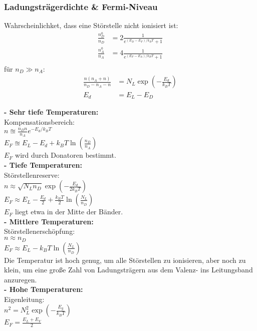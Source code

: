 \subsubsection*{Ladungsträgerdichte \& Fermi-Niveau}
Wahrscheinlichket, dass eine Störstelle nicht ionisiert ist:
\begin{equation*}
    \begin{aligned}
        \frac{n_D^0}{n_D} &= 2\frac{1}{e^{(E_D - E_F)/k_B T} +1} \\
        \frac{n_A^0}{n_A} &= 4\frac{1}{e^{(E_F - E_A)/k_B T} +1} \\
    \end{aligned}
\end{equation*}
für $n_D \gg n_A$: 
\begin{equation*}
    \begin{aligned}
        \frac{n(n_A + n)}{n_D - n_A - n} &= N_L \exp \left(- \frac{E_d}{k_B T}\right) \\
        E_d & = E_L - E_D
    \end{aligned}
\end{equation*}

\textbf{- Sehr tiefe Temperaturen:}\\
    Kompensationsbereich: \\
    $n \approxeq \frac{n_D n }{n_A} e^{-E_d / k_B T}$ \\
    $ E_F \approxeq E_L - E_d + k_B T \ln \left(\frac{n_D}{n_A}\right) $ \\
    $E_F$ wird durch Donatoren bestimmt. \\
\textbf{- Tiefe Temperaturen:} \\
    Störstellenreserve: \\
    $n \approx \sqrt{N_L n_D} \exp\left(- \frac{E_d}{2 k_B T}\right)$ \\
    $E_F \approx E_L - \frac{E_d}{2} + \frac{k_B T}{2} \ln \left(\frac{N_L}{n_D}\right)$ \\
    $E_F$ liegt etwa in der Mitte der Bänder.\\
\textbf{- Mittlere Temperaturen:} \\
    Störstellenerschöpfung: \\
    $n \approx n_D$ \\
    $E_F \approx E_L - k_B T \ln \left(\frac{N_L}{n_D}\right)$ \\
    Die Temperatur ist hoch genug, um alle Störstellen zu ionisieren, aber noch zu klein, um eine große Zahl von Ladungsträgern aus dem
    Valenz- ins Leitungsband anzuregen.\\
\textbf{- Hohe Temperaturen:} \\
    Eigenleitung: \\
    $n^2 = N_L^2 \exp \left(- \frac{E_g}{k_B T}\right)$ \\
    $E_F = \frac{E_L + E_V}{2}$ \\

